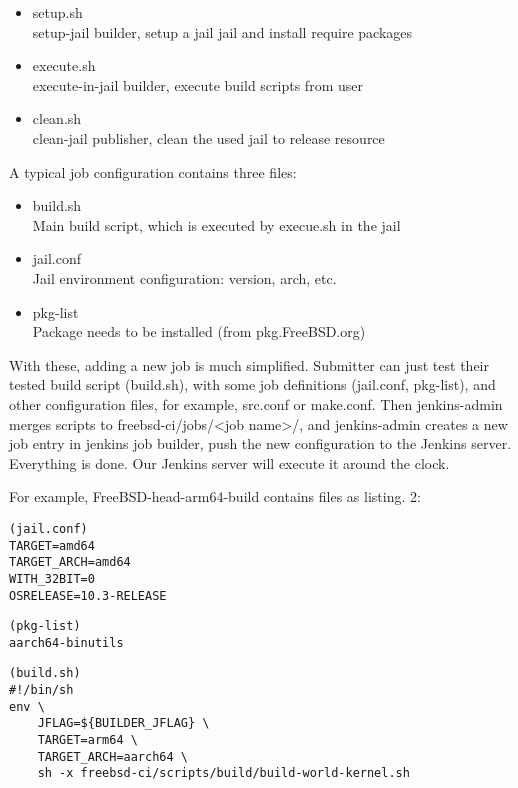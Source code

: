 \documentclass[a4paper,twocolumn,10pt]{article}
\begin{document}
\begin{itemize}
\item setup.sh\\
  setup-jail builder, setup a jail jail and install require packages
\item execute.sh\\
  execute-in-jail builder, execute build scripts from user
\item clean.sh\\
  clean-jail publisher, clean the used jail to release resource
\end{itemize}

A typical job configuration contains three files:

\begin{itemize}
\item build.sh\\
  Main build script, which is executed by execue.sh in the jail
\item jail.conf\\
  Jail environment configuration: version, arch, etc.
\item pkg-list\\
  Package needs to be installed (from pkg.FreeBSD.org)
\end{itemize}

With these, adding a new job is much simplified. Submitter can just test their
tested build script (build.sh), with some job definitions (jail.conf,
pkg-list), and other configuration files, for example, src.conf or make.conf.
Then jenkins-admin merges scripts to freebsd-ci/jobs/<job name>/, and
jenkins-admin creates a new job entry in jenkins job builder, push the new
configuration to the Jenkins server. Everything is done. Our Jenkins server
will execute it around the clock.

For example, FreeBSD-head-arm64-build contains files as listing. 2:

\begin{lstlisting}
(jail.conf)
TARGET=amd64
TARGET_ARCH=amd64
WITH_32BIT=0
OSRELEASE=10.3-RELEASE
\end{lstlisting}

\begin{lstlisting}
(pkg-list)
aarch64-binutils
\end{lstlisting}

\begin{lstlisting}
(build.sh)
#!/bin/sh
env \
	JFLAG=${BUILDER_JFLAG} \
	TARGET=arm64 \
	TARGET_ARCH=aarch64 \
	sh -x freebsd-ci/scripts/build/build-world-kernel.sh
\end{lstlisting}
\end{document}
